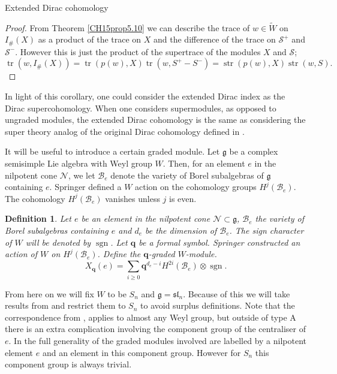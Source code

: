 \documentclass[a4paper,10pt]{amsart}
\newtheorem{definition}[theorem]{Definition}
\DeclareMathOperator{\tr}{tr}
\DeclareMathOperator{\str}{str}
\DeclareMathOperator{\sgn}{sgn}
\begin{document}
\begin{section}{Extended Dirac cohomology}
 \begin{proof} From Theorem \ref{CH15prop5.10} we can describe the trace of $w \in \tilde{W}$ on $I_\#(X)$ as a product of the trace on $X$ and the difference of the trace on $\mathcal{S}^+$ and $\mathcal{S}^-$. However this is just the product of the supertrace of the modules $X$ and $\mathcal{S}$;
 $$ \tr(w, I_\#(X)) = \tr(p(w),X)\tr(w,S^+ - S^-) = \str(p(w),X)\str(w,S).$$ \end{proof}
 In light of this corollary, one could consider the extended Dirac index as the Dirac supercohomology. When one considers supermodules, as opposed to ungraded modules, the extended Dirac cohomology is the same as considering the super theory analog of the original Dirac cohomology defined in \cite{BCT12}.

It will be useful to introduce a certain graded module. Let $\mathfrak{g}$ be a complex semisimple Lie algebra with Weyl group $W$.  Then, for an element $e$ in the nilpotent cone $\mathcal{N}$, we let $\mathcal{B}_e$ denote the variety of Borel subalgebras of $\mathfrak{g}$ containing $e$.
Springer \cite{S78} defined a $W$ action on the cohomology groups $H^j(\mathcal{B}_e)$.  The cohomology $H^j(\mathcal{B}_e)$ vanishes unless $j$ is even. 

\begin{definition} Let $e$ be an element in the nilpotent cone $\mathcal{N} \subset \mathfrak{g}$, $\mathcal{B}_e$ the variety of Borel subalgebras containing $e$ and $d_e$ be the dimension of $\mathcal{B}_e$. The sign character of $W$ will be denoted by $\sgn$. Let $\textbf{q}$ be a formal symbol. Springer \cite{S78} constructed an action of $W$ on $H^j(\mathcal{B}_e)$. 
Define the $\textbf{q}$-graded $W$-module.
$$X_{\textbf{q}}(e) = \sum_{i \geq 0} \textbf{q}^{d_e - i} H^{2i}(\mathcal{B}_e) \otimes \sgn.$$ \end{definition} 


From here on we will fix $W$ to be $S_n$ and $\mathfrak{g} = \mathfrak{sl}_n$. Because of this we will take results from \cite{CH15} and restrict them to $S_n$ to avoid surplus definitions.  Note that the correspondence from \cite[Appendix A]{CH15}, applies to almost any Weyl group, but outside of type A there is an extra complication involving the component group of the centraliser of $e$. In the full generality of \cite{CH15} the graded modules involved are labelled by a nilpotent element $e$ and an element in this component group.  However for $S_n$ this component group is always trivial.







\end{section}
\end{document}
